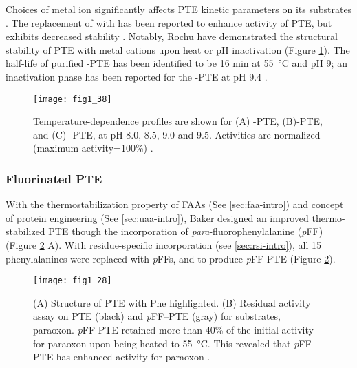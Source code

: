 \begin{refsection}
Choices of metal ion significantly affects PTE kinetic parameters on its
substrates \cite{Hanusa2011,Perezgasga2012,Carletti2009}. The replacement of
 with  has been reported to enhance activity of PTE,
but exhibits decreased stability \cite{Rochu2004}. Notably, Rochu
 have demonstrated the structural stability of PTE with metal
cations upon heat or pH inactivation \cite{Rochu2004} (Figure
\ref{fig:metal-effect}). The half-life of purified 
-PTE has been identified to be 16 min at \SI{55}{\celsius} and pH 9; an
inactivation phase has been reported for the -PTE at pH 9.4
\cite{Rochu2004}. 
\begin{figure}[htbp] \centering \texttt{[image: fig1\_38]}
    \caption[Temperature-dependence profiles are shown for (A)
    -PTE, (B)-PTE, and (C) -PTE, at pH 8.0,
8.5, 9.0 and 9.5. Activities are normalized (maximum
activity=100\%).]{Temperature-dependence profiles are shown for (A)
    -PTE, (B)-PTE, and (C) -PTE, at pH 8.0,
    8.5, 9.0 and 9.5. Activities are normalized (maximum activity=100\%)
    \cite{Rochu2004}.}
    \label{fig:metal-effect}
\end{figure}

\subsubsection{Fluorinated PTE}

With the thermostabilization property of FAAs (See
\ref{sec:faa-intro}) and concept of protein engineering (See \ref{sec:uaa-intro}),
Baker  designed an improved thermo-stabilized PTE though the
incorporation of \emph{para}-fluorophenylalanine (\emph{p}FF)
\cite{Baker2011b} (Figure \ref{fig:PJB} A). With residue-specific incorporation
(see \ref{sec:rsi-intro}), all 15 phenylalanines were replaced with \emph{p}FFs,
and to produce \emph{p}FF-PTE (Figure \ref{fig:PJB}).
\begin{figure}[htbp] \centering \texttt{[image: fig1\_28]}
    \caption[(A) Structure of PTE with Phe highlighted. (B) Residual activity
        assay on PTE (black) and \emph{p}FF-PTE (gray) for substrates,
        paraoxon. \emph{p}FF-PTE retained more than 40\% of the initial
        activity for paraoxon upon being heated to \SI{55}{\celsius}. This
        revealed that \emph{p}FF-PTE has enhanced activity for paraoxon.]{(A)
            Structure of PTE with Phe highlighted. (B) Residual activity assay
            on PTE (black) and \emph{p}FF--PTE (gray) for substrates, paraoxon.
            \emph{p}FF-PTE retained more than 40\% of the initial activity for
            paraoxon upon being heated to \SI{55}{\celsius}. This revealed that
            \emph{p}FF-PTE has enhanced activity for paraoxon
            \cite{Baker2011b}.} 
    \label{fig:PJB} 
\end{figure}


\end{refsection}
